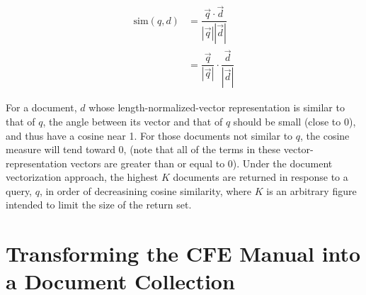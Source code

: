 \begin{equation}
\begin{split}
\textrm{sim}(q, d) & = \dfrac{\vec{q} \cdot \vec{d}}{|\vec{q}||\vec{d}|} \\
 & = \dfrac{\vec{q}}{|\vec{q}|} \cdot \dfrac{\vec{d}}{|\vec{d}|}
\end{split}
\end{equation}

\noindent
For a document, $d$ whose length-normalized-vector representation is similar to that of $q$, the angle between its vector and that of $q$ should be small (close to 0), and thus have a cosine near 1.  For those documents not similar to $q$, the cosine measure will tend toward 0, (note that all of the terms in these vector-representation vectors are greater than or equal to 0).  Under the document vectorization approach, the highest $K$ documents are returned in response to a query, $q$, in order of decreasining cosine similarity, where $K$ is an arbitrary figure intended to limit the size of the return set.




\section{Transforming the CFE Manual into a Document Collection}

